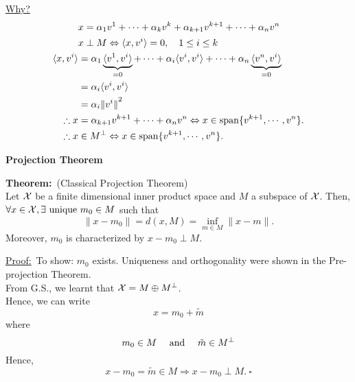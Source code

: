 \documentclass[letterpaper]{article}
\begin{document}
\underline{Why?}
    \begin{align*}
        &x = \alpha_1 v^1 + \cdots + \alpha_k v^k + \alpha_{k+1} v^{k+1} + \cdots + \alpha_n v^n\\
        &x \perp M \Leftrightarrow  \langle x, v^i \rangle =0, \quad 1 \leq i \leq k\\
        \langle x, v^i \rangle  &= \alpha_1  \underbrace{\langle v^1, v^i \rangle}_{=0}  + \cdots + \alpha_i  \langle v^i, v^i \rangle  + \cdots + \alpha_n  \underbrace{\langle v^n, v^i \rangle}_{=0} \\
        &= \alpha_i  \langle v^i, v^i \rangle\\
        &= \alpha_i {\|v^i\|}^2\\
        \therefore x &= \alpha_{k+1} v^{k+1} + \cdots + \alpha_n v^n \Leftrightarrow x \in {\rm span}\{v^{k+1}, \cdots, v^n\}.\\
        \therefore x &\in M^{\perp} \Leftrightarrow x \in {\rm span}\{v^{k+1}, \cdots, v^n\}.
    \end{align*}

\begin{center}
\textbf{Projection Theorem}
\end{center}

\noindent \textbf{Theorem:}~(Classical Projection Theorem)\\
    Let $\cal X$ be a finite dimensional inner product space and $M$ a subspace of $\cal X$. Then, $\forall x \in {\cal X}, \exists \textnormal{ unique }m_0 \in M$ such that
    \begin{equation*}
        \|x - m_0\| = d(x, M) = \inf\limits_{m \in M} \|x - m\|.
    \end{equation*}
    Moreover, $m_0$ is characterized by $x-m_0 \perp M$.

\noindent \underline{Proof:}~To show: $m_0$ exists. Uniqueness and orthogonality were shown in the Pre-projection Theorem.\\
    From G.S., we learnt that ${\cal X} = M \oplus M^{\perp}$.\\
    Hence, we can write
    $$x = m_0 + \tilde{m}$$
    where
    $$m_0 \in M \quad \textnormal{ and } \quad \tilde{m} \in M^{\perp}$$
    Hence,
    $$x-m_0 = \tilde{m} \in M \Rightarrow x-m_0 \perp M.\ \square$$
\end{document}
